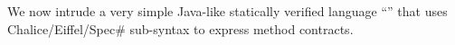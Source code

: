 We now intrude a very simple Java-like statically verified language “\svl” that uses Chalice/Eiffel/Spec\# %
 sub-syntax to express method contracts.

